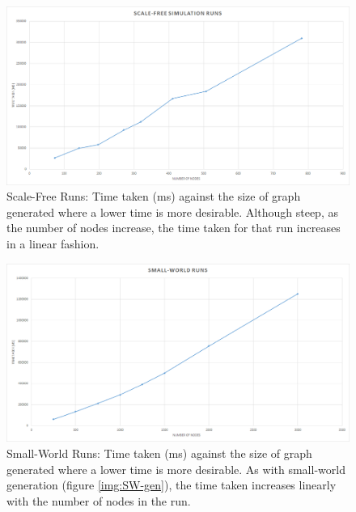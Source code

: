 \documentclass[]{report}
\begin{document}
\begin{figure}
\label{img:SF-run}
\begin{center}
\includegraphics[scale=0.4]{scale-free-runs.png}
\end{center}
\caption{Scale-Free Runs: Time taken (ms) against the size of graph generated where a lower time is more desirable. Although steep, as the number of nodes increase, the time taken for that run increases in a linear fashion.}
\end{figure}
\begin{figure}
\label{img:SW-run}
\begin{center}
\includegraphics[scale=0.4]{small-world-runs.png}
\end{center}
\caption{Small-World Runs: Time taken (ms) against the size of graph generated where a lower time is more desirable. As with small-world generation (figure \ref{img:SW-gen}), the time taken increases linearly with the number of nodes in the run.}
\end{figure}
\end{document}
